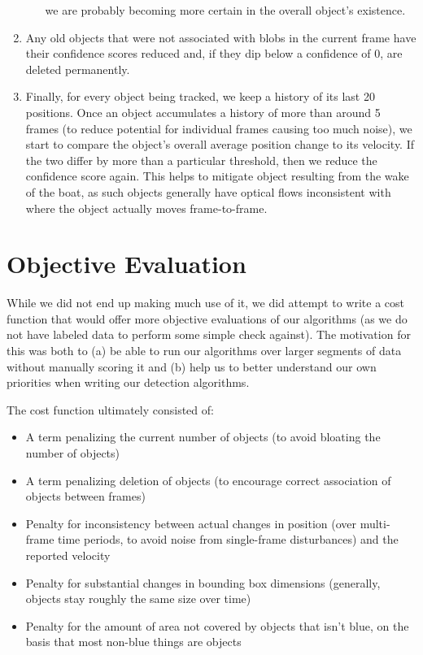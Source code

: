 \documentclass{article}
\begin{document}
\begin{enumerate}
\begin{itemize}
          we are probably becoming more certain in the overall object's
          existence.
  \end{itemize}
\item Any old objects that were not associated with blobs in the current frame
      have their confidence scores reduced and, if they dip below a confidence
      of 0, are deleted permanently.
\item Finally, for every object being tracked, we keep a history of its last 20
      positions. Once an object accumulates a history of more than around 5
      frames (to reduce potential for individual frames causing too much noise),
      we start to compare the object's overall average position change to its
      velocity. If the two differ by more than a particular threshold, then we
      reduce the confidence score again. This helps to mitigate object resulting
      from the wake of the boat, as such objects generally have optical flows
      inconsistent with where the object actually moves frame-to-frame.
\end{enumerate}

\section{Objective Evaluation}

While we did not end up making much use of it, we did attempt to write a cost
function that would offer more objective evaluations of our algorithms (as we do
not have labeled data to perform some simple check against). The
motivation for this was both to (a) be able to run our algorithms over larger
segments of data without manually scoring it and (b) help us to better
understand our own priorities when writing our detection algorithms.

The cost function ultimately consisted of:

\begin{itemize}
\item A term penalizing the current number of objects (to avoid bloating the
      number of objects)
\item A term penalizing deletion of objects (to encourage correct association
      of objects between frames)
\item Penalty for inconsistency between actual changes in position (over
      multi-frame time periods, to avoid noise from single-frame disturbances)
      and the reported velocity
\item Penalty for substantial changes in bounding box dimensions (generally,
      objects stay roughly the same size over time)
\item Penalty for the amount of area not covered by objects that isn't blue,
      on the basis that most non-blue things are objects
\end{itemize}
\end{document}
